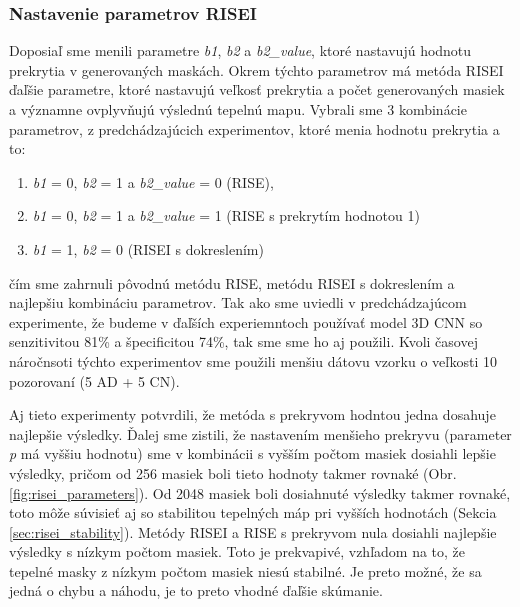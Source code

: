 \subsubsection{Nastavenie parametrov RISEI \label{sec:risei_parameters_experiment}}

Doposiaľ sme menili parametre \textit{b1}, \textit{b2} a \textit{b2\_value}, ktoré nastavujú hodnotu prekrytia v generovaných maskách. Okrem týchto parametrov má metóda RISEI ďaľšie parametre, ktoré nastavujú veľkosť prekrytia a počet generovaných masiek a významne ovplyvňujú výslednú tepelnú mapu. Vybrali sme 3 kombinácie parametrov, z predchádzajúcich experimentov, ktoré menia hodnotu prekrytia a to:

\begin{enumerate}[label=\Alph*]
    \item \textit{b1} = 0, \textit{b2} = 1 a \textit{b2\_value} = 0 (RISE),
    \item \textit{b1} = 0, \textit{b2} = 1 a \textit{b2\_value} = 1 (RISE s prekrytím hodnotou 1)
    \item \textit{b1} = 1, \textit{b2} = 0 (RISEI s dokreslením)
\end{enumerate}

čím sme zahrnuli pôvodnú metódu RISE, metódu RISEI s dokreslením a najlepšiu kombináciu parametrov. Tak ako sme uviedli v predchádzajúcom experimente, že budeme v ďaľších experiemntoch používať model 3D CNN so senzitivitou 81\% a špecificitou 74\%, tak sme sme ho aj použili. Kvoli časovej náročnsoti týchto experimentov sme použili menšiu dátovu vzorku o veľkosti 10 pozorovaní (5 AD + 5 CN).

Aj tieto experimenty potvrdili, že metóda s prekryvom hodntou jedna dosahuje najlepšie výsledky. Ďalej sme zistili, že nastavením menšieho prekryvu (parameter \textit{p} má vyššiu hodnotu) sme v kombinácii s vyšším počtom masiek dosiahli lepšie výsledky, pričom od 256 masiek boli tieto hodnoty takmer rovnaké (Obr. \ref{fig:risei_parameters}). Od 2048 masiek boli dosiahnuté výsledky takmer rovnaké, toto môže súvisieť aj so stabilitou tepelných máp pri vyšších hodnotách (Sekcia \ref{sec:risei_stability}). Metódy RISEI a RISE s prekryvom nula dosiahli najlepšie výsledky s nízkym počtom masiek. Toto je prekvapivé, vzhľadom na to, že tepelné masky z nízkym počtom masiek niesú stabilné. Je preto možné, že sa jedná o chybu a náhodu, je to preto vhodné ďaľšie skúmanie.

